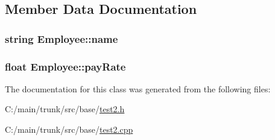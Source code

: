 \subsection{Member Data Documentation}
\hypertarget{class_employee_a1934a85a4a9a8fd00ae04425c5cc4f67}{
\subsubsection[{name}]{\setlength{\rightskip}{0pt plus 5cm}string {\bf Employee::name}}}
\label{class_employee_a1934a85a4a9a8fd00ae04425c5cc4f67}
\hypertarget{class_employee_a5d97c95da8ec82d1b6f66de6e6879806}{
\subsubsection[{payRate}]{\setlength{\rightskip}{0pt plus 5cm}float {\bf Employee::payRate}}}
\label{class_employee_a5d97c95da8ec82d1b6f66de6e6879806}


The documentation for this class was generated from the following files:\begin{DoxyCompactItemize}
\item 
C:/main/trunk/src/base/\hyperlink{test2_8h}{test2.h}\item 
C:/main/trunk/src/base/\hyperlink{test2_8cpp}{test2.cpp}\end{DoxyCompactItemize}
